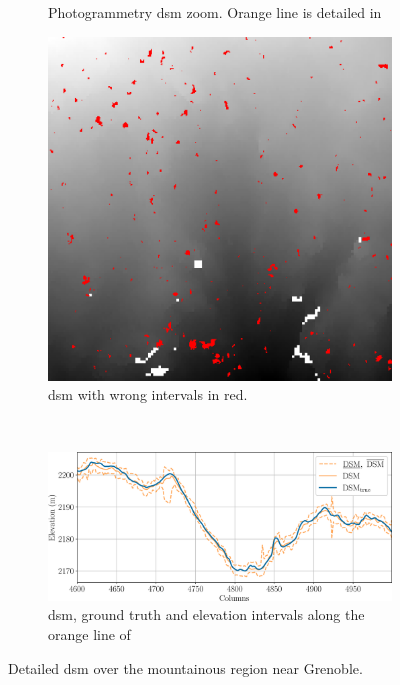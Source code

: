 \begin{figure}
\begin{subfigure}[t]{0.3\linewidth}
        \caption{Photogrammetry \acrshort{dsm} zoom. Orange line is detailed in }
        \label{fig:grenoble_dsm_zoom}
    \end{subfigure}\hfill
    \begin{subfigure}[t]{0.3\linewidth}
        \flushright %
        \includegraphics[width=0.807\linewidth]{Images/Chap_6/Grenoble_error_zoom_3600-4000_4600-5000.png}
        \caption{\acrshort{dsm} with wrong intervals in red.}
        \label{fig:grenoble_error_zoom}
    \end{subfigure}\\
    \begin{subfigure}[t]{\linewidth}
        \centering
        \includegraphics[width=\linewidth]{Images/Chap_6/Grenoble_row_3800.png}
        \caption{\acrshort{dsm}, ground truth and elevation intervals along the orange line of }
        \label{fig:grenoble_zoom_row}
    \end{subfigure}
    \caption{Detailed \acrshort{dsm} over the mountainous region near Grenoble.}
    \label{fig:grenoble_zoom}
\end{figure}

